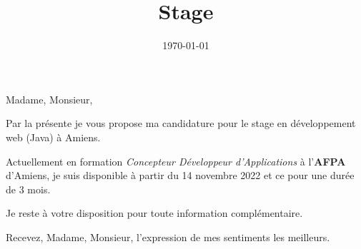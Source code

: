 \documentclass[12pt]{moderncv}
\title{Stage}
\begin{document}
\date{\today}
\makelettertitle
Madame, Monsieur,

Par la présente je vous propose ma candidature pour le stage en développement web (Java) à Amiens.

Actuellement en formation \textit{Concepteur Développeur d'Applications} à l'\textbf{AFPA} d'Amiens, je suis disponible à partir du 14 novembre 2022 et ce pour une durée de 3 mois.

Je reste à votre disposition pour toute information complémentaire.

Recevez, Madame, Monsieur, l'expression de mes sentiments les meilleurs.

\makeletterclosing
\end{document}
